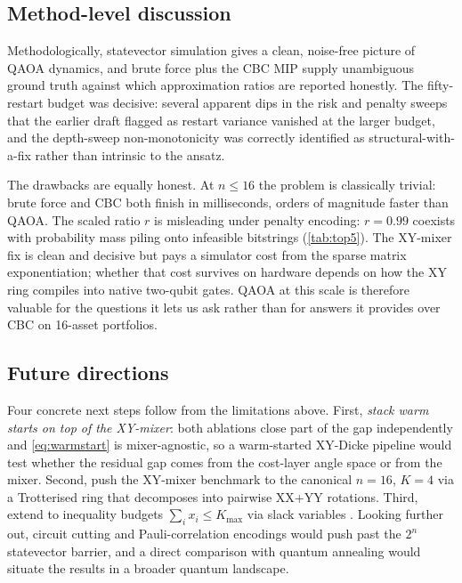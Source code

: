 \subsection{Method-level discussion}

Methodologically, statevector simulation gives a clean, noise-free picture of QAOA dynamics, and brute force plus the CBC MIP supply unambiguous ground truth against which approximation ratios are reported honestly. The fifty-restart budget was decisive: several apparent dips in the risk and penalty sweeps that the earlier draft flagged as restart variance vanished at the larger budget, and the depth-sweep non-monotonicity was correctly identified as structural-with-a-fix rather than intrinsic to the ansatz.

The drawbacks are equally honest. At $n \leq 16$ the problem is classically trivial: brute force and CBC both finish in milliseconds, orders of magnitude faster than QAOA. The scaled ratio $r$ is misleading under penalty encoding: $r=0.99$ coexists with probability mass piling onto infeasible bitstrings (\cref{tab:top5}). The XY-mixer fix is clean and decisive but pays a simulator cost from the sparse matrix exponentiation; whether that cost survives on hardware depends on how the XY ring compiles into native two-qubit gates. QAOA at this scale is therefore valuable for the questions it lets us ask rather than for answers it provides over CBC on 16-asset portfolios.

\subsection{Future directions}

Four concrete next steps follow from the limitations above. First, \emph{stack warm starts on top of the XY-mixer}: both ablations close part of the gap independently and \cref{eq:warmstart} is mixer-agnostic, so a warm-started XY-Dicke pipeline would test whether the residual gap comes from the cost-layer angle space or from the mixer. Second, push the XY-mixer benchmark to the canonical $n=16$, $K=4$ via a Trotterised ring that decomposes into pairwise XX+YY rotations. Third, extend to inequality budgets $\sum_i x_i \leq K_{\max}$ via slack variables \parencite{thomassin2025slack}. Looking further out, circuit cutting \parencite{soloviev2025cutting} and Pauli-correlation encodings \parencite{soloviev2025pauli} would push past the $2^n$ statevector barrier, and a direct comparison with quantum annealing \parencite{morapakula2025annealing} would situate the results in a broader quantum landscape.
